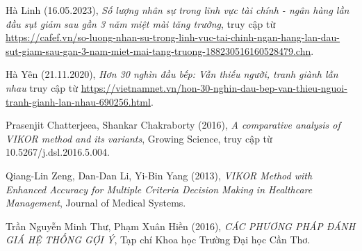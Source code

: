 \begin{thebibliography}{99}
    Hà Linh (16.05.2023),
    \emph{Số lượng nhân sự trong lĩnh vực tài chính - ngân hàng lần đầu sụt giảm sau gần 3 năm miệt mài tăng trưởng},
    truy cập từ \href{https://cafef.vn/so-luong-nhan-su-trong-linh-vuc-tai-chinh-ngan-hang-lan-dau-sut-giam-sau-gan-3-nam-miet-mai-tang-truong-188230516160528479.chn}{\color{black}https://cafef.vn/so-luong-nhan-su-trong-linh-vuc-tai-chinh-ngan-hang-lan-dau-sut-giam-sau-gan-3-nam-miet-mai-tang-truong-188230516160528479.chn}.

    Hà Yên (21.11.2020),
    \emph{Hơn 30 nghìn đầu bếp: Vẫn thiếu người, tranh giành lẫn nhau}
    truy cập từ \href{https://vietnamnet.vn/hon-30-nghin-dau-bep-van-thieu-nguoi-tranh-gianh-lan-nhau-690256.html#:~:text=Vi%E1%BB%87t%20Nam%20hi%E1%BB%87n%20c%C3%B3%20kho%E1%BA%A3ng,th%E1%BB%B1c%20Vi%E1%BB%87t%20ra%20th%E1%BA%BF%20gi%E1%BB%9Bi}{\color{black}https://vietnamnet.vn/hon-30-nghin-dau-bep-van-thieu-nguoi-tranh-gianh-lan-nhau-690256.html}.

    Prasenjit Chatterjeea, Shankar Chakraborty (2016),
    \emph{A comparative analysis of VIKOR method and its variants},
    Growing Science,
    truy cập từ 10.5267/j.dsl.2016.5.004.

    Qiang-Lin Zeng, Dan-Dan Li, Yi-Bin Yang (2013),
    \emph{VIKOR Method with Enhanced Accuracy for Multiple Criteria Decision Making in Healthcare Management},
    Journal of Medical Systems.

    Trần Nguyễn Minh Thư, Phạm Xuân Hiền (2016),
    \emph{CÁC PHƯƠNG PHÁP ĐÁNH GIÁ HỆ THỐNG GỢI Ý},
    Tạp chí Khoa học Trường Đại học Cần Thơ.
\end{thebibliography}